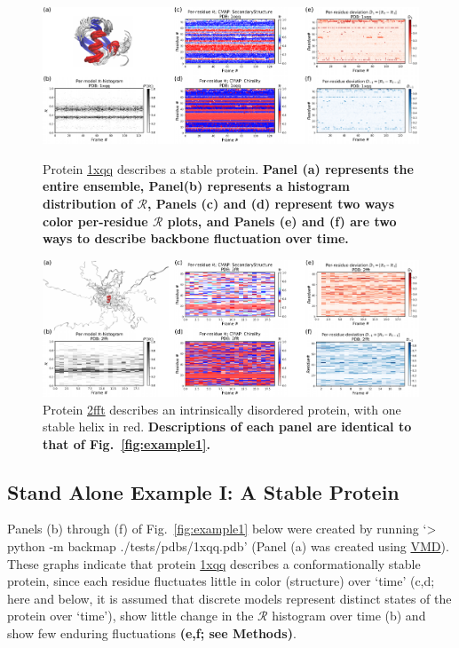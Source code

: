 \documentclass[fleqn,10pt,lineno]{wlpeerj} %
\newcommand{\Fig}[1]{Fig.~\ref{#1}}
\newcommand{\n}[1]{{\textbf{\color{red}#1}}}
\newcommand{\rr}{$\mathcal{R}$\xspace}
\begin{document}
\begin{figure}[t!]
\includegraphics[width=1.0\linewidth]{backmap_fig10.pdf}
\caption{Protein \href{https://www.rcsb.org/structure/1XQQ}{1xqq} describes a stable protein. \n{Panel (a) represents the entire ensemble, Panel(b) represents a histogram distribution of \rr, Panels (c) and (d) represent two ways color per-residue \rr plots, and Panels (e) and (f) are two ways to describe backbone fluctuation over time.}\label{fig:example1}} 
\includegraphics[width=1.0\linewidth]{backmap_fig11.pdf}
\caption{Protein \href{https://www.rcsb.org/structure/2FFT}{2fft} describes an intrinsically disordered protein, with one stable helix in red.
\n{Descriptions of each panel are identical to that of \Fig{fig:example1}.}\label{fig:example2}} 
\end{figure}

\subsection*{Stand Alone Example I: A Stable Protein}

Panels (b) through (f) of \Fig{fig:example1} below were created by running `> python -m backmap ./tests/pdbs/1xqq.pdb' (Panel (a) was created using \href{http://www.ks.uiuc.edu/Research/vmd/}{VMD}). These graphs indicate that protein \href{https://www.rcsb.org/structure/1XQQ}{1xqq} describes a conformationally stable protein, since each residue fluctuates little in color (structure) over `time' (c,d; here and below, it is assumed that discrete models represent distinct states of the protein over `time'), show little change in the \rr histogram over time (b) and show few enduring fluctuations \n{(e,f; see Methods)}. 
\end{document}
